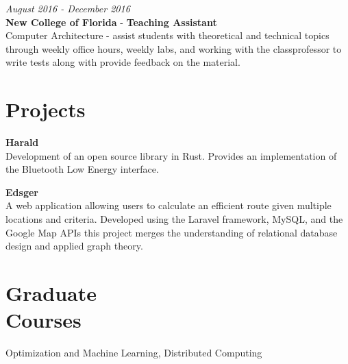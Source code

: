 \documentclass[margin,line,a4paper]{resume}
\begin{document}
\begin{resume}
        \textit{August 2016 - December 2016}\\
        \textbf{New College of Florida} - \textbf{Teaching Assistant}\\
        Computer Architecture -  assist students with theoretical and technical topics through weekly office hours, weekly labs, and working with the class\textquotesingle professor to write tests along with provide feedback on the material.
    
    \section{\mysidestyle Projects}
        \textbf{Harald}\\
        Development of an open source library in Rust. Provides an implementation of the Bluetooth Low Energy interface.
        
        \textbf{Edsger}\\
        A web application allowing users to                              calculate an efficient route given
        multiple locations and criteria. Developed
        using the Laravel framework, MySQL, and the Google Map APIs this project merges the understanding of relational database design and applied graph theory.
        
    \section{\mysidestyle Graduate\\Courses}
        Optimization and Machine Learning, Distributed Computing

\end{resume}
\end{document}
